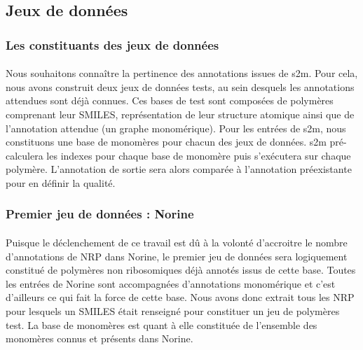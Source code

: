 \documentclass[12pt,french,twoside]{report}
\begin{document}
\subsection{Jeux de données}

\subsubsection{Les constituants des jeux de données}

\paragraph{}Nous souhaitons connaître la pertinence des annotations issues de s2m.
Pour cela, nous avons construit deux jeux de données tests, au sein desquels les annotations attendues sont déjà connues.
Ces bases de test sont composées de polymères comprenant leur SMILES, représentation de leur structure atomique ainsi que de l'annotation attendue (un graphe monomérique).
Pour les entrées de s2m, nous constituons une base de monomères pour chacun des jeux de données.
s2m pré-calculera les indexes pour chaque base de monomère puis s'exécutera sur chaque polymère.
L'annotation de sortie sera alors comparée à l'annotation préexistante pour en définir la qualité.


\subsubsection{Premier jeu de données : Norine}

\paragraph{}Puisque le déclenchement de ce travail est dû à la volonté d'accroitre le nombre d'annotations de NRP dans Norine, le premier jeu de données sera logiquement constitué de polymères non ribosomiques déjà annotés issus de cette base.
Toutes les entrées de Norine sont accompagnées d'annotations monomérique et c'est d'ailleurs ce qui fait la force de cette base.
Nous avons donc extrait tous les NRP pour lesquels un SMILES était renseigné pour constituer un jeu de polymères test.
La base de monomères est quant à elle constituée de l'ensemble des monomères connus et présents dans Norine.


\end{document}
